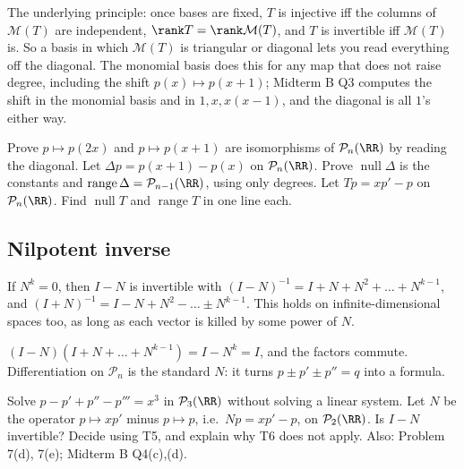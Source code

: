 \documentclass[11pt]{scrartcl}
\DeclareMathOperator{\nul}{null}
\DeclareMathOperator{\range}{range}
\newcommand{\PP}{\mathcal P}
\newcommand{\MM}{\mathcal M}
\begin{document}
The underlying principle: once bases are fixed, $T$ is injective iff the columns of $\MM(T)$ are independent, $\rank T=\rank\MM(T)$, and $T$ is invertible iff $\MM(T)$ is. So a basis in which $\MM(T)$ is triangular or diagonal lets you read everything off the diagonal. The monomial basis does this for any map that does not raise degree, including the shift $p(x)\mapsto p(x+1)$; Midterm B Q3 computes the shift in the monomial basis and in $1,x,x(x-1)$, and the diagonal is all $1$'s either way.
\probs
\begin{enumerate}[(a)]
  \ii Prove $p\mapsto p(2x)$ and $p\mapsto p(x+1)$ are isomorphisms of $\PP_n(\RR)$ by reading the diagonal.
  \ii Let $\Delta p=p(x+1)-p(x)$ on $\PP_n(\RR)$. Prove $\nul\Delta$ is the constants and $\range\Delta=\PP_{n-1}(\RR)$, using only degrees.
  \ii Let $Tp=xp'-p$ on $\PP_n(\RR)$. Find $\nul T$ and $\range T$ in one line each.
\end{enumerate}

\subsection{Nilpotent inverse}
\begin{theorem*}[T6]
  If $N^k=0$, then $I-N$ is invertible with $(I-N)^{-1}=I+N+N^2+\dots+N^{k-1}$, and $(I+N)^{-1}=I-N+N^2-\dots\pm N^{k-1}$.
  This holds on infinite-dimensional spaces too, as long as each vector is killed by some power of $N$.
\end{theorem*}
\why $(I-N)(I+N+\dots+N^{k-1})=I-N^k=I$, and the factors commute.
Differentiation on $\PP_n$ is the standard $N$: it turns $p\pm p'\pm p''=q$ into a formula.
\probs
\begin{enumerate}[(a)]
  \ii Solve $p-p'+p''-p'''=x^3$ in $\PP_3(\RR)$ without solving a linear system.
  \ii Let $N$ be the operator $p\mapsto xp'$ minus $p\mapsto p$, i.e.\ $Np=xp'-p$, on $\PP_2(\RR)$. Is $I-N$ invertible? Decide using T5, and explain why T6 does not apply.
  \ii Also: Problem 7(d), 7(e); Midterm B Q4(c),(d).
\end{enumerate}
\end{document}
